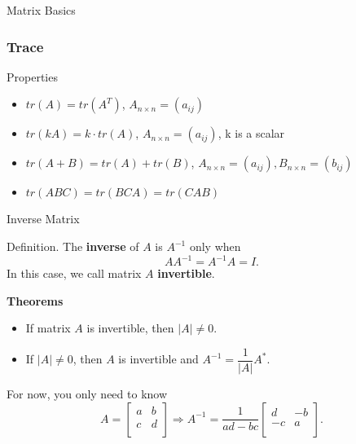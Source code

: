 \documentclass{beamer}
\begin{document}
\begin{section}{Matrix Basics}
\begin{frame}
    \frametitle{Trace}
    \begin{block}{Properties}
        \begin{itemize}
            \item $tr(A)=tr(A^T)$,     \quad $A_{n\times n} = (a_{ij})$
            \item $tr(kA)=k\cdot tr(A)$,     \quad $A_{n\times n} = (a_{ij})$, k is a scalar
            \item $tr(A+B) = tr(A)+tr(B)$, \quad $A_{n\times n} = (a_{ij}), B_{n\times n} = (b_{ij})$
            \item $tr(ABC)=tr(BCA)=tr(CAB)$
        \end{itemize}
        
    \end{block}
    
\end{frame}

\begin{frame}[label=7]{Inverse Matrix}
        \begin{block}{Definition.} The \textbf{inverse} of $A$ is $A^{-1}$ only when 
        \begin{equation*}
            AA^{-1} = A^{-1}A = I.
        \end{equation*}
        In this case, we call matrix $A$ \textbf{invertible}.

        \end{block}

        \textbf{Theorems}
        \begin{itemize}
            \item If matrix $A$ is invertible, then $|A| \neq 0$. 
            \item If $|A| \neq 0$, then $A$ is invertible and $A^{-1} = \dfrac{1}{|A|} A^{*}$. 
        \end{itemize}

        \par For now, you only need to know 
        \begin{equation*}
            A = \left[\begin{array}{cc} a & b \\ c & d \\ \end{array} \right] \Rightarrow A^{-1} = \frac{1}{ad - bc} \left[ \begin{array}{cc} d & -b \\ -c & a \\ \end{array} \right]. 
        \end{equation*}
\end{frame}


\end{section}
\end{document}
